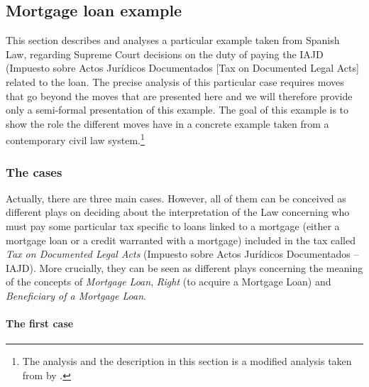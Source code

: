 		\subsection{Mortgage loan example}
			
			This section describes and analyses a particular example taken from Spanish Law, regarding Supreme Court decisions on the duty of paying the IAJD (Impuesto sobre Actos Jurídicos Documentados [Tax on Documented Legal Acts] related to the loan. The precise analysis of this particular case requires moves that go beyond the moves that are presented here and we will therefore provide only a semi-formal presentation of this example. The goal of this example is to show the role the different moves have in a concrete example taken from a contemporary civil law system.\footnote{The analysis and the description in this section is a modified analysis taken from  by  \textcite{martinez2022elements}.} 
			
			\subsubsection{The cases}
			
			Actually, there are three main cases. However, all of them can be conceived as different plays on deciding about the interpretation of the Law concerning who must pay some particular tax specific to loans linked to a mortgage (either a mortgage loan or a credit warranted with a mortgage) included in the tax called \textit{Tax on Documented Legal Acts} (Impuesto sobre Actos Jurídicos Documentados – IAJD). More crucially, they can be seen as different plays concerning the meaning of the concepts of \textit{Mortgage Loan}, \textit{Right} (to acquire a Mortgage Loan) and \textit{Beneficiary of a Mortgage Loan}.
			
			
			\paragraph{The first case}
			
